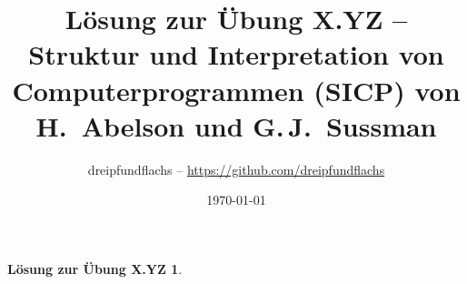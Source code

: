 \documentclass[a4paper,11pt,reqno]{amsart}
\theoremstyle{uremark}
\newtheorem*{loes}{L\"osung zur \"Ubung X.YZ}
\begin{document}
\title[]{L\"osung zur \"Ubung X.YZ -- Struktur und Interpretation von
Computerprogrammen (SICP) von H.~Abelson und G.\,J.~Sussman}
\author{dreipfundflachs --
\href{https://github.com/dreipfundflachs}{https://github.com/dreipfundflachs}}
\date{\today}
\maketitle

\begin{loes}

\end{loes}

    
\end{document}
